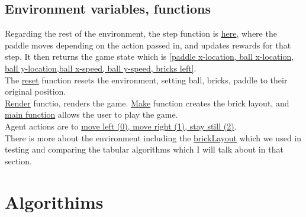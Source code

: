 \documentclass[twoside,11pt]{article}
\begin{document}
\subsection{Environment variables, functions} 
Regarding the rest of the environment, the step function is \href{https://github.com/duoduocai-dot/csc498-project/blob/f46268a6c9241b77efd6c96a6dd8ecc3ec5bae1e/breakout.py#L266}{here}, where the paddle moves depending on the action passed in, and updates rewards for that step. It then returns the game state which is \href{https://github.com/duoduocai-dot/csc498-project/blob/f46268a6c9241b77efd6c96a6dd8ecc3ec5bae1e/breakout.py#L246}{[paddle x-location, ball x-location, ball y-location,ball x-speed, ball y-speed, bricks left]}.
\\
The \href{https://github.com/duoduocai-dot/csc498-project/blob/f46268a6c9241b77efd6c96a6dd8ecc3ec5bae1e/breakout.py#L299}{reset} function resets the environment, setting ball, bricks, paddle to their original position. 
\\ \href{https://github.com/duoduocai-dot/csc498-project/blob/f46268a6c9241b77efd6c96a6dd8ecc3ec5bae1e/breakout.py#L316}{Render} functio, renders the game. \href{https://github.com/duoduocai-dot/csc498-project/blob/f46268a6c9241b77efd6c96a6dd8ecc3ec5bae1e/breakout.py#L332}{Make} function creates the brick layout, and \href{https://github.com/duoduocai-dot/csc498-project/blob/f46268a6c9241b77efd6c96a6dd8ecc3ec5bae1e/breakout.py#L335}{main function} allows the user to play the game. 
\\
Agent actions are to \href{https://github.com/duoduocai-dot/csc498-project/blob/f46268a6c9241b77efd6c96a6dd8ecc3ec5bae1e/breakout.py#L270}{move left (0), move right (1), stay still (2)}.
\\
There is more about the environment including the \href{https://github.com/duoduocai-dot/csc498-project/blob/f46268a6c9241b77efd6c96a6dd8ecc3ec5bae1e/breakout.py#L55}{brickLayout} which we used in testing and comparing the tabular algorithms which I will talk about in that section.  

\section{Algorithims}
\end{document}
